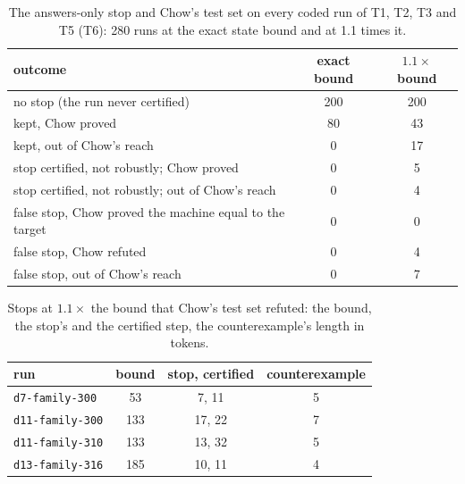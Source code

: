 \documentclass[11pt]{article}
\begin{document}
\begin{table}[t]
\centering
\caption{The answers-only stop and Chow's test set on every coded run of T1, T2, T3 and T5 (T6): 280
runs at the exact state bound and at 1.1 times it.}
\label{tab:proof}
\begin{tabular}{lcc}
\toprule
outcome & exact bound & $1.1 \times$ bound \\
\midrule
no stop (the run never certified) & 200 & 200 \\
kept, Chow proved & 80 & 43 \\
kept, out of Chow's reach & 0 & 17 \\
stop certified, not robustly; Chow proved & 0 & 5 \\
stop certified, not robustly; out of Chow's reach & 0 & 4 \\
false stop, Chow proved the machine equal to the target & 0 & 0 \\
false stop, Chow refuted & 0 & 4 \\
false stop, out of Chow's reach & 0 & 7 \\
\bottomrule
\end{tabular}
\end{table}

\begin{table}[t]
\centering
\caption{Stops at $1.1 \times$ the bound that Chow's test set refuted: the bound, the stop's and the
certified step, the counterexample's length in tokens.}
\label{tab:refuted}
\begin{tabular}{lccc}
\toprule
run & bound & stop, certified & counterexample \\
\midrule
\texttt{d7-family-300} & 53 & 7, 11 & 5 \\
\texttt{d11-family-300} & 133 & 17, 22 & 7 \\
\texttt{d11-family-310} & 133 & 13, 32 & 5 \\
\texttt{d13-family-316} & 185 & 10, 11 & 4 \\
\bottomrule
\end{tabular}
\end{table}
\end{document}
